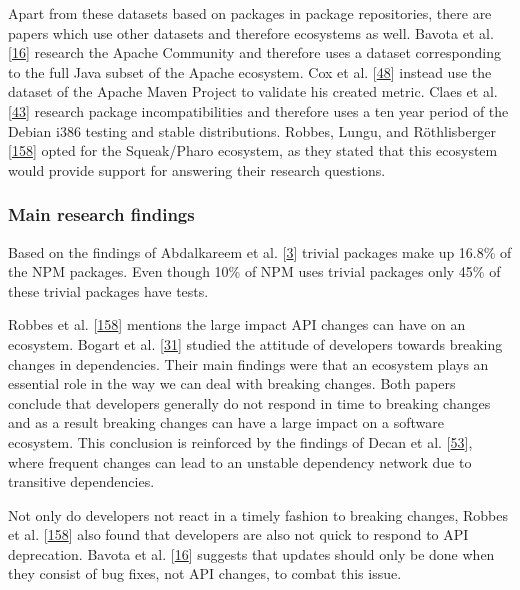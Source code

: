 \documentclass[]{book}
\begin{document}
Apart from these datasets based on packages in package repositories,
there are papers which use other datasets and therefore ecosystems as
well. Bavota et al. {[}\protect\hyperlink{ref-Bavota2014}{16}{]}
research the Apache Community and therefore uses a dataset corresponding
to the full Java subset of the Apache ecosystem. Cox et al.
{[}\protect\hyperlink{ref-Cox2015}{48}{]} instead use the dataset of the
Apache Maven Project to validate his created metric. Claes et al.
{[}\protect\hyperlink{ref-Claes2015}{43}{]} research package
incompatibilities and therefore uses a ten year period of the Debian
i386 testing and stable distributions. Robbes, Lungu, and Röthlisberger
{[}\protect\hyperlink{ref-Robbes2012}{158}{]} opted for the Squeak/Pharo
ecosystem, as they stated that this ecosystem would provide support for
answering their research questions.

\subsubsection{Main research findings}\label{main-research-findings}

Based on the findings of Abdalkareem et al.
{[}\protect\hyperlink{ref-Abdalkareem2017}{3}{]} trivial packages make
up 16.8\% of the NPM packages. Even though 10\% of NPM uses trivial
packages only 45\% of these trivial packages have tests.

Robbes et al. {[}\protect\hyperlink{ref-Robbes2012}{158}{]} mentions the
large impact API changes can have on an ecosystem. Bogart et al.
{[}\protect\hyperlink{ref-Bogart2016}{31}{]} studied the attitude of
developers towards breaking changes in dependencies. Their main findings
were that an ecosystem plays an essential role in the way we can deal
with breaking changes. Both papers conclude that developers generally do
not respond in time to breaking changes and as a result breaking changes
can have a large impact on a software ecosystem. This conclusion is
reinforced by the findings of Decan et al.
{[}\protect\hyperlink{ref-Decan2018}{53}{]}, where frequent changes can
lead to an unstable dependency network due to transitive dependencies.

Not only do developers not react in a timely fashion to breaking
changes, Robbes et al. {[}\protect\hyperlink{ref-Robbes2012}{158}{]}
also found that developers are also not quick to respond to API
deprecation. Bavota et al. {[}\protect\hyperlink{ref-Bavota2014}{16}{]}
suggests that updates should only be done when they consist of bug
fixes, not API changes, to combat this issue.
\end{document}

